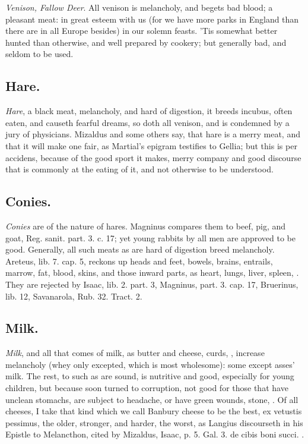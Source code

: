 {{\emph{Venison, Fallow Deer}. All venison is melancholy, and begets bad blood;
a pleasant meat: in great esteem with us (for we have more parks in
England than there are in all Europe besides) in our solemn feasts.
'Tis somewhat better hunted than otherwise, and well prepared by
cookery; but generally bad, and seldom to be used.
\subsection{Hare.}
\emph{Hare}, a black meat, melancholy, and hard of digestion, it
breeds incubus, often eaten, and causeth fearful dreams, so doth all
venison, and is condemned by a jury of physicians. Mizaldus and some
others say, that hare is a merry meat, and that it will make one fair,
as Martial's epigram testifies to Gellia; but this is per accidens,
because of the good sport it makes, merry company and good discourse
that is commonly at the eating of it, and not otherwise to be
understood.

\subsection{Conies.}
\emph{Conies} are of the nature of hares. Magninus compares
them to beef, pig, and goat, Reg. sanit. part. 3. c. 17; yet young
rabbits by all men are approved to be good.
Generally, all such meats as are hard of digestion breed melancholy.
Areteus, lib. 7. cap. 5, reckons up heads and feet, bowels,
brains, entrails, marrow, fat, blood, skins, and those inward parts, as
heart, lungs, liver, spleen, \etc{}. They are rejected by Isaac, lib. 2.
part. 3, Magninus, part. 3. cap. 17, Bruerinus, lib. 12, Savanarola,
Rub. 32. Tract. 2.

\subsection{Milk.}
\emph{Milk}, and all that comes of milk, as butter and cheese, curds,
\etc{}, increase melancholy (whey only excepted, which is most wholesome):
some except asses' milk. The rest, to such as are sound, is
nutritive and good, especially for young children, but because soon
turned to corruption, not good for those that have unclean
stomachs, are subject to headache, or have green wounds, stone, \etc{}. Of
all cheeses, I take that kind which we call Banbury cheese to be the
best, ex vetustis pessimus, the older, stronger, and harder, the worst,
as Langius discourseth in his Epistle to Melancthon, cited by Mizaldus,
Isaac, p. 5. Gal. 3. de cibis boni succi. \etc{}.

}}
